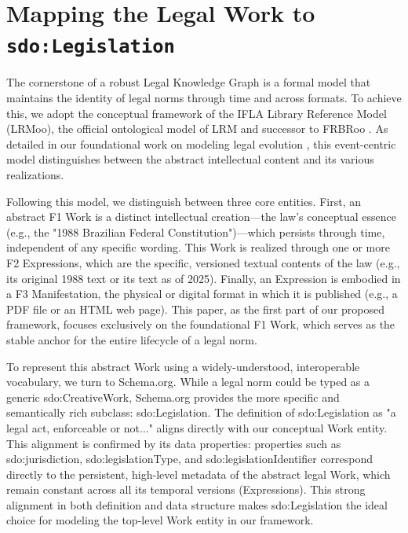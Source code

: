 \documentclass[11pt]{article}
\begin{document}
\section{Mapping the Legal Work to \texttt{sdo:Legislation}} 
\label{sec:mapping_work}
The cornerstone of a robust Legal Knowledge Graph is a formal model that maintains the identity of legal norms through time and across formats. To achieve this, we adopt the conceptual framework of the IFLA Library Reference Model (LRMoo), the official ontological model of LRM and successor to FRBRoo \cite{lrmoo2024}. As detailed in our foundational work on modeling legal evolution \cite{demartim2025temporal}, this event-centric model distinguishes between the abstract intellectual content and its various realizations.

Following this model, we distinguish between three core entities. First, an abstract F1 Work is a distinct intellectual creation—the law's conceptual essence (e.g., the "1988 Brazilian Federal Constitution")—which persists through time, independent of any specific wording. This Work is realized through one or more F2 Expressions, which are the specific, versioned textual contents of the law (e.g., its original 1988 text or its text as of 2025). Finally, an Expression is embodied in a F3 Manifestation, the physical or digital format in which it is published (e.g., a PDF file or an HTML web page). This paper, as the first part of our proposed framework, focuses exclusively on the foundational F1 Work, which serves as the stable anchor for the entire lifecycle of a legal norm.

To represent this abstract Work using a widely-understood, interoperable vocabulary, we turn to Schema.org. While a legal norm could be typed as a generic sdo:CreativeWork, Schema.org provides the more specific and semantically rich subclass: sdo:Legislation. The definition of sdo:Legislation as "a legal act, enforceable or not..." aligns directly with our conceptual Work entity. This alignment is confirmed by its data properties: properties such as sdo:jurisdiction, sdo:legislationType, and sdo:legislationIdentifier correspond directly to the persistent, high-level metadata of the abstract legal Work, which remain constant across all its temporal versions (Expressions). This strong alignment in both definition and data structure makes sdo:Legislation the ideal choice for modeling the top-level Work entity in our framework.
\end{document}
